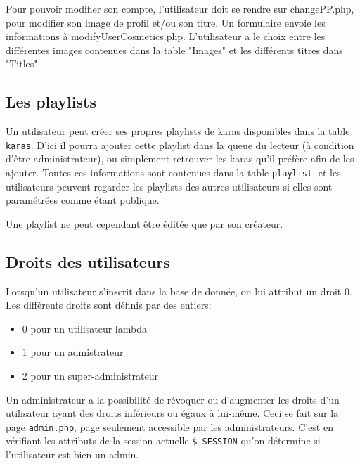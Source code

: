Pour pouvoir modifier son compte, l'utilisateur doit se rendre sur changePP.php, pour modifier son image de profil et/ou son titre. Un formulaire envoie les informations à modifyUserCosmetics.php. L'utilisateur a le choix entre les différentes images contenues dans la table "Images" et les différents titres dans "Titles". \newline

\subsection{Les playlists}

Un utilisateur peut créer ses propres playlists de karas disponibles dans la table \texttt{karas}.
D'ici il pourra ajouter cette playlist dans la queue du lecteur (à condition d'être administrateur), ou simplement retrouver les karas qu'il préfère afin de les ajouter.
Toutes ces informations sont contenues dans la table \texttt{playlist}, et les utilisateurs peuvent regarder les playlists des autres utilisateurs si elles sont paramétrées comme étant publique.

Une playlist ne peut cependant être éditée que par son créateur.

\subsection{Droits des utilisateurs}
Lorsqu'un utilisateur s'inscrit dans la base de donnée, on lui attribut un droit 0. Les différents droits sont définis par des entiers:
\begin{itemize}
	\item 0 pour un utilisateur lambda
	\item 1 pour un admistrateur
	\item 2 pour un super-administrateur
\end{itemize}
Un administrateur a la possibilité de révoquer ou d'augmenter les droits d'un utilisateur ayant des droits inférieurs ou égaux à lui-même. Ceci se fait sur la page \texttt{admin.php}, page seulement accessible par les administrateurs. C'est en vérifiant les attributs de la session actuelle \texttt{\$\_SESSION} qu'on détermine si l'utilisateur est bien un admin.
